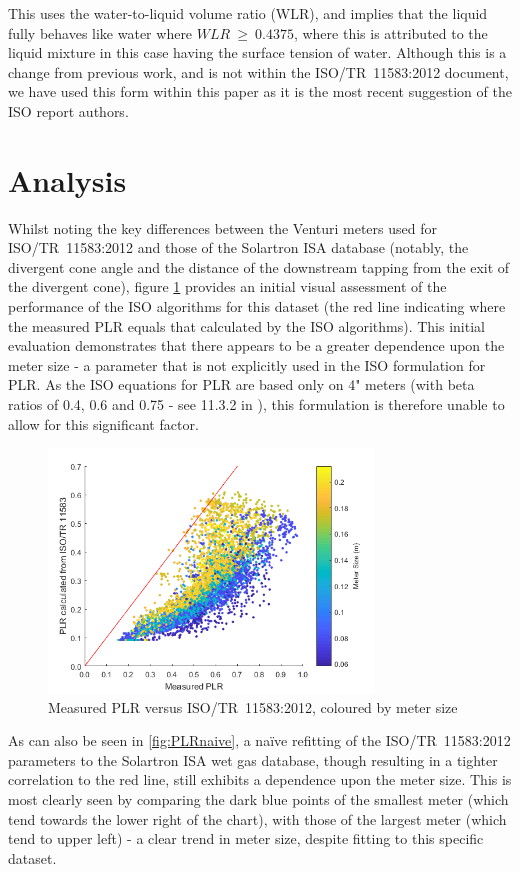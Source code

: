 \documentclass[journal]{IEEEtran}
\begin{document}
This uses the water-to-liquid volume ratio (WLR), and implies that the liquid fully behaves like water where $WLR~\geq~0.4375$, where this is attributed to the liquid mixture in this case having the surface tension of water.  Although this is a change from previous work, and is not within the ISO/TR~11583:2012 document, we have used this form within this paper as it is the most recent suggestion of the ISO report authors.

\section{Analysis}

Whilst noting the key differences between the Venturi meters used for ISO/TR~11583:2012 and those of the Solartron ISA database (notably, the divergent cone angle and the distance of the downstream tapping from the exit of the divergent cone), figure \ref{fig:PLR2} provides an initial visual assessment of the performance of the ISO algorithms for this dataset (the red line indicating where the measured PLR equals that calculated by the ISO algorithms). This initial evaluation demonstrates that there appears to be a greater dependence upon the meter size - a parameter that is not explicitly used in the ISO formulation for \acrshort{PLR}. As the ISO equations for PLR are based only on 4" meters (with beta ratios of 0.4, 0.6 and 0.75 - see 11.3.2 in \cite{Reader-Harris2015}), this formulation is therefore unable to allow for this significant factor. 

\begin{figure}[h]
\centering
\includegraphics[width=3.4in]{PLR2.png}
\caption[]{ Measured PLR versus ISO/TR~11583:2012, coloured by meter size }
\label{fig:PLR2}
\end{figure}

As can also be seen in \ref{fig:PLRnaive}, a na{\"i}ve refitting of the ISO/TR~11583:2012 parameters to the Solartron ISA wet gas database, though resulting in a tighter correlation to the red line, still exhibits a dependence upon the meter size.  This is most clearly seen by comparing the dark blue points of the smallest meter (which tend towards the lower right of the chart), with those of the largest meter (which tend to upper left) - a clear trend in meter size, despite fitting to this specific dataset.
\end{document}
